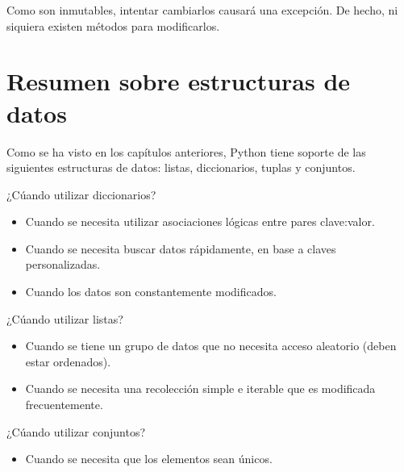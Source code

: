 
Como son inmutables, intentar cambiarlos causará una excepción.
De hecho, ni siquiera existen métodos para modificarlos.


\section{Resumen sobre estructuras de datos}

Como se ha visto en los capítulos anteriores, Python tiene soporte de las siguientes estructuras de datos: listas, diccionarios, tuplas y conjuntos.

¿Cúando utilizar diccionarios?

\begin{itemize}
  \item Cuando se necesita utilizar asociaciones lógicas entre pares clave:valor.
  
  \item Cuando se necesita buscar datos rápidamente, en base a claves personalizadas.
  
  \item Cuando los datos son constantemente modificados.
  
\end{itemize}

¿Cúando utilizar listas?

\begin{itemize}
  \item Cuando se tiene un grupo de datos que no necesita acceso aleatorio (deben estar ordenados).
  
  \item Cuando se necesita una recolección simple e iterable que es modificada frecuentemente.
  
\end{itemize}

¿Cúando utilizar conjuntos?

\begin{itemize}
  \item Cuando se necesita que los elementos sean únicos.
\end{itemize}

